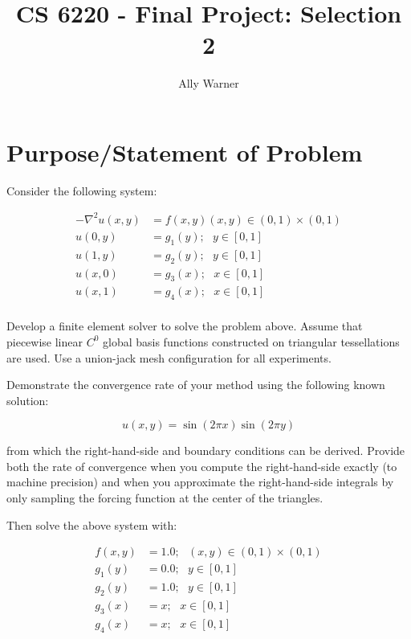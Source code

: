\documentclass[11pt, oneside]{article}   	%
\title{CS 6220 - Final Project: Selection 2}
\author{Ally Warner}
\begin{document}
\maketitle

\section{Purpose/Statement of Problem}

Consider the following system:

\begin{align*}
-\nabla^2 u(x,y) &= f(x,y) (x,y) \in (0,1) \times (0,1)\\
u(0,y) &= g_1(y); \text{ }y \in [0,1]\\
u(1,y) &= g_2(y); \text{ } y\in [0,1]\\
u(x,0) &= g_3(x); \text{ } x\in [0,1]\\
u(x,1) &= g_4(x); \text{ }x \in [0,1]\\
\end{align*}

Develop a finite element solver to solve the problem above. Assume that piecewise linear $C^0$ global basis functions constructed on triangular tessellations are used. Use a union-jack mesh configuration for all experiments.

\vspace{5mm}

Demonstrate the convergence rate of your method using the following known solution:

\[
u(x,y) = \sin(2\pi x)\sin(2\pi y)
\]

from which the right-hand-side and boundary conditions can be derived. Provide both the rate of convergence when you compute the right-hand-side exactly (to machine precision) and when you approximate the right-hand-side integrals by only sampling the forcing function at the center of the triangles.

\vspace{5mm}

Then solve the above system with:

\begin{align*}
f(x,y) &= 1.0; \text{ } (x,y) \in (0,1) \times (0,1)\\
g_1(y) &= 0.0; \text{ } y \in [0,1]\\
g_2(y) &= 1.0; \text{ } y \in [0,1]\\
g_3(x) &= x; \text{ } x \in [0,1]\\
g_4(x) &= x; \text{ } x \in [0,1]\\
\end{align*}
\end{document}
